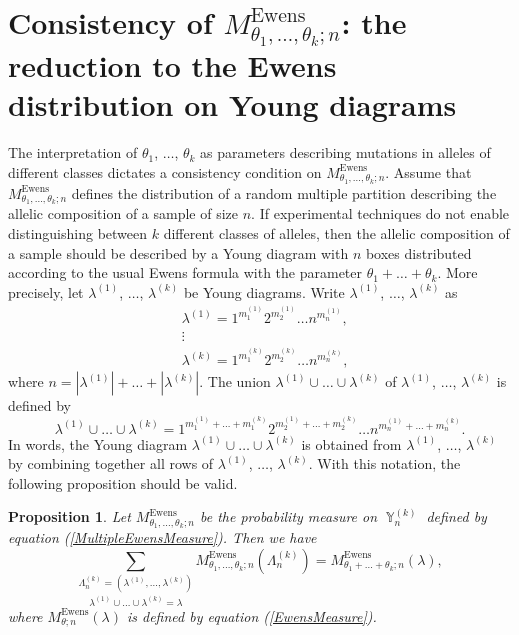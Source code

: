 \documentclass[12pt]{amsart}
\newtheorem{prop}[thm]{Proposition}
\theoremstyle{definition}
\numberwithin{equation}{section}
\DeclareMathOperator{\Y}{\mathbb{Y}}
\DeclareMathOperator{\Ewens}{Ewens}
\begin{document}
\section{Consistency of $M_{\theta_1,\ldots,\theta_k;n}^{\Ewens}$: the reduction to the  Ewens distribution on Young diagrams}\label{SectionConsistency}
The interpretation of $\theta_1$, $\ldots$, $\theta_k$ as parameters describing mutations in alleles of different classes dictates a consistency condition on
$M_{\theta_1,\ldots,\theta_k;n}^{\Ewens}$.  Assume that $M_{\theta_1,\ldots,\theta_k;n}^{\Ewens}$ defines the distribution of a random multiple partition describing the allelic composition of a sample of size $n$.
If experimental techniques do not enable distinguishing between $k$ different classes of alleles, then the allelic composition of a sample
should be described by a Young diagram with $n$ boxes distributed according to the usual Ewens formula with the parameter $\theta_1+\ldots+\theta_k$.
More precisely, let $\lambda^{(1)}$, $\ldots$, $\lambda^{(k)}$ be Young diagrams.
Write $\lambda^{(1)}$, $\ldots$, $\lambda^{(k)}$ as
\begin{equation}
\begin{split}
&\lambda^{(1)}=1^{m_1^{(1)}}2^{m_2^{(1)}}\ldots n^{m_n^{(1)}},\\
&\vdots\\
&\lambda^{(k)}=1^{m_1^{(k)}}2^{m_2^{(k)}}\ldots n^{m_n^{(k)}},
\end{split}
\end{equation}
where $n=|\lambda^{(1)}|+\ldots+|\lambda^{(k)}|$. The union
$\lambda^{(1)}\cup\ldots\cup\lambda^{(k)}$ of $\lambda^{(1)}$, $\ldots$, $\lambda^{(k)}$ is defined by
$$
\lambda^{(1)}\cup\ldots\cup\lambda^{(k)}=
1^{m_1^{(1)}+\ldots+m_1^{(k)}}2^{m_2^{(1)}+\ldots+m_2^{(k)}}\ldots n^{m_n^{(1)}+\ldots+m_n^{(k)}}.
$$
In words, the Young diagram $\lambda^{(1)}\cup\ldots\cup\lambda^{(k)}$ is obtained from $\lambda^{(1)}$, $\ldots$, $\lambda^{(k)}$ by combining together all rows of $\lambda^{(1)}$, $\ldots$, $\lambda^{(k)}$.
With this notation,
the following proposition should be valid.
\begin{prop}
Let $M_{\theta_1,\ldots,\theta_k;n}^{\Ewens}$ be the probability
measure on $\Y_n^{(k)}$ defined by equation (\ref{MultipleEwensMeasure}).
Then we have
\begin{equation}\label{7.2.1}
\underset{\lambda^{(1)}\cup\ldots\cup\lambda^{(k)}=\lambda}{\sum\limits_{\Lambda_n^{(k)}
=\left(\lambda^{(1)},\ldots,\lambda^{(k)}\right)}}
M_{\theta_1,\ldots,\theta_k;n}^{\Ewens}\left(\Lambda_n^{(k)}\right)=
M_{\theta_1+\ldots+\theta_k;n}^{\Ewens}\left(\lambda\right),
\end{equation}
where $M_{\theta;n}^{\Ewens}\left(\lambda\right)$ is defined by equation (\ref{EwensMeasure}).
\end{prop}
\end{document}
